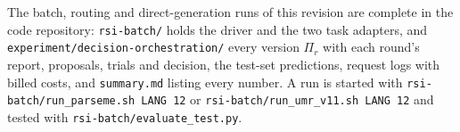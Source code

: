 The batch, routing and direct-generation runs of this revision are complete in the code repository: \texttt{rsi-batch/} holds the driver and the two task adapters, and \texttt{experiment/decision-orchestration/} every version $\Pi_r$ with each round's report, proposals, trials and decision, the test-set predictions, request logs with billed costs, and \texttt{summary.md} listing every number. A run is started with \texttt{rsi-batch/run\_parseme.sh LANG 12} or \texttt{rsi-batch/run\_umr\_v11.sh LANG 12} and tested with \texttt{rsi-batch/evaluate\_test.py}.
